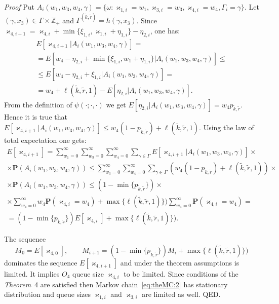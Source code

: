 \textit{{Proof}} 
Put 
$A_i(w_1,w_3,w_4,\gamma) = \{\omega \colon \varkappa_{1,i}=w_1,\varkappa_{3,i}=w_3, \varkappa_{4,i}=w_4, \Gamma_i=\gamma \}$.
Let $(\gamma, x_3) \in \Gamma \times {\mathbb Z}_+$ and
$\Gamma^{(\tilde{k},\tilde{r})}=h(\gamma,x_3)$. Since
$\varkappa_{4,i+1}=\varkappa_{4,i}+\min\{\xi_{1,i}, \varkappa_{1,i}+\eta_{1,i}\}-\eta_{2,i}$, one has:
\begin{multline*}
    E[\varkappa_{4,i+1} | A_i(w_1,w_3,w_4,\gamma)] = \\
    =
    E[w_4 - \eta_{2,i} +  \min{\{\xi_{1,i}, w_1 + \eta_{1,i} \}} | A_i(w_1,w_3,w_4,\gamma)] \leqslant \\
    \leqslant
     E[w_4 - \eta_{2,i} +  \xi_{1,i} | A_i(w_1,w_3,w_4,\gamma)] =\\ 
    =
   w_4 + \ell(\tilde{k},\tilde{r},1)  -  E[\eta_{2,i} |A_i(w_1,w_3,w_4,\gamma)].
\end{multline*}
From the  definition of $\psi(\cdot;\cdot,\cdot)$ we get
$  E[\eta_{2,i} | A_i(w_1,w_3,w_4,\gamma)]= w_4 p_{\tilde{k},\tilde{r}}$.
Hence it is true that
   $  E[\varkappa_{4,i+1} | A_i(w_1,w_3,w_4,\gamma)] \leqslant
     w_4 (1-p_{\tilde{k},\tilde{r}}) + \ell(\tilde{k},\tilde{r},1)$.
Using the law of total expectation one gets:
\begin{multline*}
    E[\varkappa_{4,i+1}]
    =\sum_{w_1=0}^{\infty} \sum_{w_3=0}^{\infty}  \sum_{w_4=0}^{\infty} \sum_{\gamma \in \Gamma}  E[\varkappa_{4,i+1} | A_i(w_1,w_3,w_4,\gamma)]  \times \\ 
    \times
    {\mathbf P}( A_i(w_1,w_3,w_4,\gamma))  
    \leqslant
    \sum_{w_3=0}^{\infty}  \sum_{w_4=0}^{\infty} \sum_{\gamma \in \Gamma} 
    ( w_4 (1-p_{\tilde{k},\tilde{r}}) + \ell(\tilde{k},\tilde{r},1) ) \times \\   \times 
    {\mathbf P}( A_i(w_1,w_3,w_4,\gamma)) 
    \leqslant
     (1-\min{\{p_{\tilde{k},\tilde{r}}\}}) \times \\ \times \sum_{w_4=0}^{\infty}   w_4 {\mathbf P}(\varkappa_{4,i}=w_4) + \max{\{\ell(\tilde{k},\tilde{r},1)\}} )   \sum_{w_4=0}^{\infty}{\mathbf P}(\varkappa_{4,i}=w_4) = \\
     =
      (1-\min{\{p_{\tilde{k},\tilde{r}}\}})  E[\varkappa_{4,i}] + \max{\{\ell(\tilde{k},\tilde{r},1)\}} ).
\end{multline*}

The sequence 
$$
M_0=E[\varkappa_{4,0}],\qquad  M_{i+1}= (1-\min{\{p_{\tilde{k},\tilde{r}}\}})
M_{i} + \max{\{\ell(\tilde{k},\tilde{r},1)\}} ) 
$$ dominates the sequence $E[\varkappa_{4,i+1}]$ and under the theorem assumptions is limited. It implies $O_4$ queue size $\varkappa_{4,i}$ to be limited. Since conditions of the \textit{Theorem}~4 are satisfied then Markov chain~\eqref{eq:theMC:2} has stationary distribution and queue sizes $\varkappa_{1,i}$ and $\varkappa_{3,i}$ are limited as well. QED.

